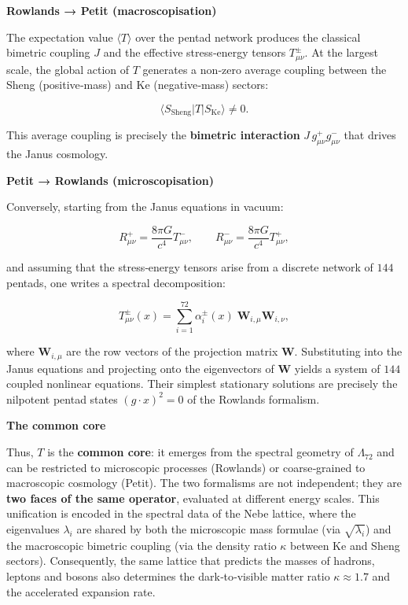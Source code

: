 \documentclass[11pt]{article}
\begin{document}
\textbf{Rowlands → Petit (macroscopisation)}

The expectation value \(\langle T \rangle\) over the pentad network
produces the classical bimetric coupling \(J\) and the effective
stress‑energy tensors \(T_{\mu\nu}^\pm\). At the largest scale, the
global action of \(T\) generates a non‑zero average coupling between the
Sheng (positive‑mass) and Ke (negative‑mass) sectors:

\[
\langle S_{\text{Sheng}} | T | S_{\text{Ke}} \rangle \neq 0.
\]

This average coupling is precisely the \textbf{bimetric interaction}
\(J \, g_{\mu\nu}^+ g_{\mu\nu}^-\) that drives the Janus cosmology.

\textbf{Petit → Rowlands (microscopisation)}

Conversely, starting from the Janus equations in vacuum:

\[
R_{\mu\nu}^+ = \frac{8\pi G}{c^4} T_{\mu\nu}^-,\qquad
R_{\mu\nu}^- = \frac{8\pi G}{c^4} T_{\mu\nu}^+,
\]

and assuming that the stress‑energy tensors arise from a discrete
network of \(144\) pentads, one writes a spectral decomposition:

\[
T_{\mu\nu}^\pm(x) = \sum_{i=1}^{72} \alpha_i^\pm(x) \; \mathbf{W}_{i,\mu} \mathbf{W}_{i,\nu},
\]

where \(\mathbf{W}_{i,\mu}\) are the row vectors of the projection
matrix \(\mathbf{W}\). Substituting into the Janus equations and
projecting onto the eigenvectors of \(\mathbf{W}\) yields a system of
\(144\) coupled nonlinear equations. Their simplest stationary solutions
are precisely the nilpotent pentad states \((g\cdot x)^2 = 0\) of the
Rowlands formalism.

\textbf{The common core}

Thus, \(T\) is the \textbf{common core}: it emerges from the spectral
geometry of \(\Lambda_{72}\) and can be restricted to microscopic
processes (Rowlands) or coarse‑grained to macroscopic cosmology (Petit).
The two formalisms are not independent; they are \textbf{two faces of
the same operator}, evaluated at different energy scales. This
unification is encoded in the spectral data of the Nebe lattice, where
the eigenvalues \(\lambda_i\) are shared by both the microscopic mass
formulae (via \(\sqrt{\lambda_i}\)) and the macroscopic bimetric
coupling (via the density ratio \(\kappa\) between Ke and Sheng
sectors). Consequently, the same lattice that predicts the masses of
hadrons, leptons and bosons also determines the dark‑to‑visible matter
ratio \(\kappa \approx 1.7\) and the accelerated expansion rate.
\end{document}

